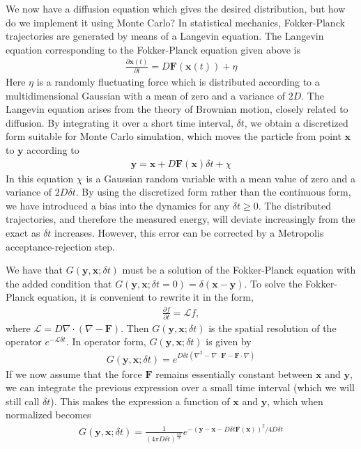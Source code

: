 \documentclass[twoside,english]{uiofysmaster}
\begin{document}
We now have a diffusion equation which gives the desired distribution, but how do we implement it using Monte Carlo? In statistical mechanics, Fokker-Planck trajectories are generated by means of a Langevin equation. The Langevin equation corresponding to the Fokker-Planck equation given above is 
\begin{align}
	\frac{\partial \bm{x} (t)}{\partial t} = D \bm{F} (\bm{x}(t)) + \eta
\end{align}
Here $\eta$ is a randomly fluctuating force which is distributed according to a multidimensional Gaussian with a mean of zero and a variance of $2D$. The Langevin equation arises from the theory of Brownian motion, closely related to diffusion. By integrating it over a short time interval, $\delta t$, we obtain a discretized form suitable for Monte Carlo simulation, which moves the particle from point $\bm{x}$ to $\bm{y}$ according to 
\begin{align}
	\bm{y} = \bm{x} + D \bm{F} (\bm{x}) \delta t + \chi
\end{align}
In this equation $\chi$ is a Gaussian random variable with a mean value of zero and a variance of $2D \delta t$. By using the discretized form rather than the continuous form, we have introduced a bias into the dynamics for any $\delta t \geq 0$. The distributed trajectories, and therefore the measured energy, will deviate increasingly from the exact as $\delta t$ increases. However, this error can be corrected by a Metropolis acceptance-rejection step.

We have that $G(\bm{y}, \bm{x}; \delta t)$ must be a solution of the Fokker-Planck equation with the added condition that $G(\bm{y}, \bm{x}; \delta t = 0) = \delta (\bm{x} - \bm{y})$. To solve the Fokker-Planck equation, it is convenient to rewrite it in the form, 
\begin{align}
	\frac{\partial f}{\partial t} = \mathcal{L} f,
\end{align}
where $\mathcal{L} = D \nabla \cdot (\nabla - \bm{F})$. Then $G(\bm{y}, \bm{x}; \delta t)$ is the spatial resolution of the operator $e^{-\mathcal{L} \delta t}$. In operator form, $G(\bm{y}, \bm{x}; \delta t)$ is given by 
\begin{align}
	G(\bm{y}, \bm{x}; \delta t)  = e^{ D \delta t ( \nabla^2 - \nabla \cdot \bm{F} - \bm{F} \cdot \nabla ) }
\end{align}
If we now assume that the force $\bm{F}$ remains essentially constant between $\bm{x}$ and $\bm{y}$, we can integrate the previous expression over a small time interval (which we will still call $\delta t$). This makes the expression a function of $\bm{x}$ and $\bm{y}$, which when normalized becomes
\begin{align}
	G(\bm{y}, \bm{x}; \delta t) = \frac{1}{(4 \pi D \delta t)^{\frac{3N}{2}}} e^{ - ( \bm{y} - \bm{x} - D\delta t \bm{F}(\bm{x}) )^2 / 4D \delta t }
\end{align}
\end{document}
